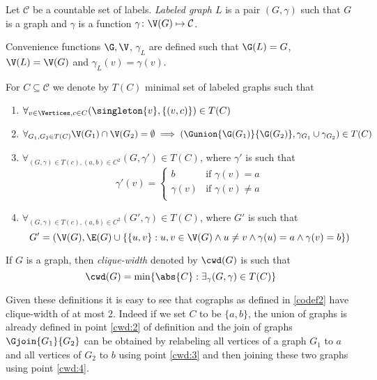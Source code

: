 \begin{defi}
    Let $\mathcal{C}$ be a countable set of labels. \emph{Labeled graph $L$} is a pair $(G, \gamma)$ such that $G$ is a graph and $\gamma$ is a function $\gamma \colon \V(G) \mapsto \mathcal{C}$.

    Convenience functions $\G, \V$, $\gamma_L$ are defined such that $\G(L) = G$, $\V(L) = \V(G)$ and $\gamma_L(v) = \gamma(v)$.
\end{defi}
\begin{defi}
    For $C \subseteq \mathcal{C}$ we denote by $T(C)$ minimal set of labeled graphs such that
    \begin{enumerate}
        \item $\forall_{v \in \Vertices, c \in C} (\singleton{v}, \{(v,c)\}) \in T(C)$
        \item $\forall_{G_1, G_2 \in T(C)} \V(G_1) \cap \V(G_2) = \emptyset \implies (\Gunion{\G(G_1)}{\G(G_2)}, \gamma_{G_1} \cup \gamma_{G_2}) \in T(C)$ \label{cwd:2}
        \item $\forall_{(G, \gamma) \in T(c), (a,b) \in C^2} (G, \gamma') \in T(C)$, where $\gamma'$ is such that
              \[
                  \gamma'(v) = \begin{cases}
                      b         & \text{if } \gamma(v) = a    \\
                      \gamma(v) & \text{if } \gamma(v) \neq a \\
                  \end{cases}
              \] \label{cwd:3}
        \item $\forall_{(G, \gamma) \in T(c), (a,b) \in C^2} (G', \gamma) \in T(C)$, where $G'$ is such that
              \[
                  G' = (\V(G), \E(G) \cup \{\{u, v\}: u,v\in\V(G) \land u \neq v\land \gamma(u) = a \land \gamma(v) = b\})
              \] \label{cwd:4}
    \end{enumerate}
\end{defi}
\begin{defi}
    If $G$ is a graph, then \emph{clique-width} denoted by $\cwd(G)$ is such that
    \[
        \cwd(G) = \min\{\abs{C} : \exists_\gamma (G, \gamma) \in T(C)\}
    \]
\end{defi}

Given these definitions it is easy to see that cographs as defined in \ref{codef2} have clique-width of at most 2. Indeed if we set $C$ to be $\{a,b\}$, the union of graphs is already defined in point \ref{cwd:2} of definition and the join of graphs $\Gjoin{G_1}{G_2}$ can be obtained by relabeling all vertices of a graph $G_1$ to $a$ and all vertices of  $G_2$ to $b$ using point \ref{cwd:3} and then joining these two graphs using point \ref{cwd:4}.

